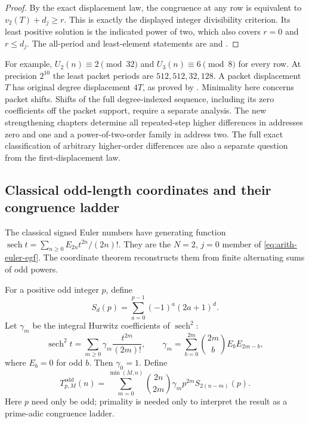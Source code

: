 \begin{proof}
By the exact displacement law, the congruence at any row is equivalent to
$v_2(T)+d_j\ge r$.  This is exactly the displayed integer
divisibility criterion.  Its least positive solution is the indicated
power of two, which also covers $r=0$ and $r\le d_j$.
The all-period and least-element statements are
 and
.
\end{proof}

For example, $U_2(n)\equiv2\pmod{32}$ and $U_3(n)\equiv6\pmod8$
for every row.  At precision $2^{10}$ the least packet periods are
$512,512,32,128$.  A packet displacement $T$ has original degree
displacement $4T$, as proved by
.
Minimality here concerns packet shifts.  Shifts of the full degree-indexed
sequence, including its zero coefficients off the packet support, require
a separate analysis.  The new strengthening chapters determine all repeated-step higher differences in addresses zero and one and a power-of-two-order family in address two. The full exact classification of arbitrary higher-order differences
are also a separate question from the first-displacement law.

\subsection{Classical odd-length coordinates and their congruence ladder}

The classical signed Euler numbers have generating function
$\operatorname{sech}t=\sum_{n\ge0}E_{2n}t^{2n}/(2n)!$.
They are the $N=2$, $j=0$ member of
\eqref{eq:arith-euler-egf}.  The coordinate theorem reconstructs
them from finite alternating sums of odd powers.

\begin{definition}
\label{def:arith-odd-source}
For a positive odd integer $p$, define
\[
 S_d(p)=\sum_{a=0}^{p-1}(-1)^a(2a+1)^d.
\]
Let $\gamma_m$ be the integral Hurwitz coefficients of $\operatorname{sech}^2$:
\[
 \operatorname{sech}^2t=\sum_{m\ge0}\gamma_m\frac{t^{2m}}{(2m)!},
 \qquad
 \gamma_m=\sum_{b=0}^{2m}\binom{2m}{b}E_bE_{2m-b},
\]
where $E_b=0$ for odd $b$.  Then $\gamma_0=1$.  Define
\[
 T^{\mathrm{odd}}_{p,M}(n)=\sum_{m=0}^{\min(M,n)}
       \binom{2n}{2m}\gamma_m p^{2m}S_{2(n-m)}(p).
\]
Here $p$ need only be odd; primality is needed only to interpret the
result as a prime-adic congruence ladder.
\end{definition}

